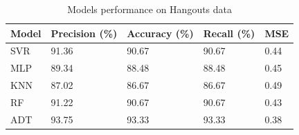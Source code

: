 \begin{table}[t]
    \centering
    \caption{Models performance on Hangouts data}
    \label{class-hangouts}
    \begin{tabular}{|l|l|l|l|l|}
        \hline
        \textbf{Model} & \textbf{Precision (\%)} & \textbf{Accuracy (\%)} & \textbf{Recall (\%)} & \textbf{MSE} \\ \hline
        SVR            & 91.36                        & 90.67                       & 90.67                     & 0.44                  \\ \hline
        MLP            & 89.34                        & 88.48                       & 88.48                     & 0.45                  \\ \hline
        KNN       & 87.02                        & 86.67                       & 86.67                     & 0.49                  \\ \hline 
        RF       & 91.22                        & 90.67                       & 90.67                     &  0.43                 \\ \hline 
        ADT       & 93.75                        & 93.33                       & 93.33                     & 0.38                  \\ \hline 
    \end{tabular}
\end{table}


